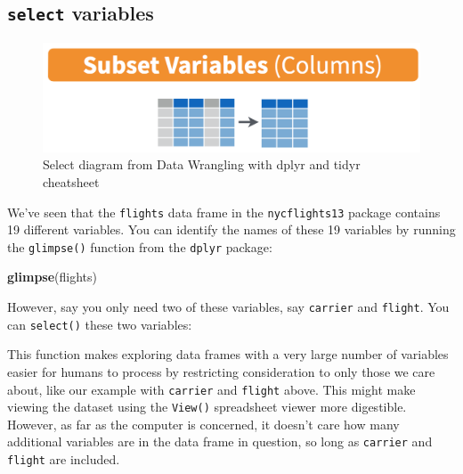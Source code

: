 \documentclass[12pt, krantz2,]{krantz}
\makeatletter
\newenvironment{Shaded}{\begin{snugshade}}{\end{snugshade}}
\newcommand{\KeywordTok}[1]{\textcolor[rgb]{0.27,0.27,0.27}{\textbf{#1}}}
\newcommand{\NormalTok}[1]{#1}
\newcommand{\OperatorTok}[1]{\textcolor[rgb]{0.43,0.43,0.43}{\textbf{#1}}}
\newcommand{\StringTok}[1]{\textcolor[rgb]{0.5,0.5,0.5}{#1}}
\newenvironment{kframe}{%
\medskip{}
\setlength{\fboxsep}{.8em}
 \def\at@end@of@kframe{}%
 \ifinner\ifhmode%
  \def\at@end@of@kframe{\end{minipage}}%
  \begin{minipage}{\columnwidth}%
 \fi\fi%
 \def\FrameCommand##1{\hskip\@totalleftmargin \hskip-\fboxsep
 \colorbox{shadecolor}{##1}\hskip-\fboxsep
     \hskip-\linewidth \hskip-\@totalleftmargin \hskip\columnwidth}%
 \MakeFramed {\advance\hsize-\width
   \@totalleftmargin\z@ \linewidth\hsize
   \@setminipage}}%
 {\par\unskip\endMakeFramed%
 \at@end@of@kframe}
\renewenvironment{Shaded}{\begin{kframe}}{\end{kframe}}
\makeatother
\begin{document}
\hypertarget{select}{%
\subsection{\texorpdfstring{\texttt{select} variables}{select variables}}\label{select}}

\begin{figure}

{\centering \includegraphics[width=\textwidth]{images/select} 

}

\caption{Select diagram from Data Wrangling with dplyr and tidyr cheatsheet}\label{fig:selectfig}
\end{figure}

We've seen that the \texttt{flights} data frame in the \texttt{nycflights13} package contains 19 different variables. You can identify the names of these 19 variables by running the \texttt{glimpse()} function from the \texttt{dplyr} package:

\begin{Shaded}
\begin{Highlighting}[]
\KeywordTok{glimpse}\NormalTok{(flights)}
\end{Highlighting}
\end{Shaded}

However, say you only need two of these variables, say \texttt{carrier} and \texttt{flight}. You can \texttt{select()} these two variables:

\begin{Shaded}
\end{Shaded}

This function makes exploring data frames with a very large number of variables easier for humans to process by restricting consideration to only those we care about, like our example with \texttt{carrier} and \texttt{flight} above. This might make viewing the dataset using the \texttt{View()} spreadsheet viewer more digestible. However, as far as the computer is concerned, it doesn't care how many additional variables are in the data frame in question, so long as \texttt{carrier} and \texttt{flight} are included.
\end{document}
